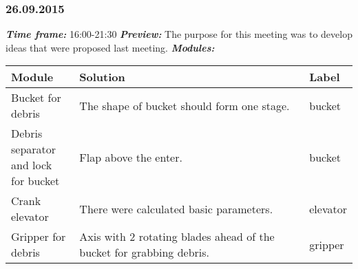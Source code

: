 \subsubsection{26.09.2015}
	\textit{\textbf{Time frame:}} 16:00-21:30 \newline
	\textit{\textbf{Preview:}} The purpose for this meeting was to develop ideas that were proposed last meeting.\newline \newline
	\textit{\textbf{Modules:}}

  \begin{table}[H]
	\vspace{-2mm}
	\begin{center}
		\begin{tabular}{|p{0.2\linewidth}|p{0.7\linewidth}|p{0.1\linewidth}|}
			\hline
			Module & Solution & Label \\
			\hline
			Bucket for debris & The shape of bucket should form one stage. & bucket \\
			\hline
			Debris separator and lock for bucket & Flap above the enter. & bucket \\
			\hline
			Crank elevator & There were calculated basic parameters. & elevator \\
			\hline
			Gripper for debris & Axis with 2 rotating blades ahead of the bucket for grabbing debris. & gripper \\
			\hline
		\end{tabular}
	\end{center}
  \end{table}
  

